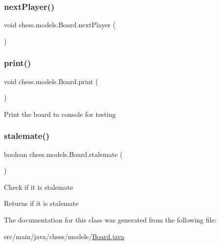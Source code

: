 \subsubsection{\texorpdfstring{next\+Player()}{nextPlayer()}}
{\footnotesize\ttfamily void chess.\+models.\+Board.\+next\+Player (\begin{DoxyParamCaption}{ }\end{DoxyParamCaption})}

\mbox{\label{classchess_1_1models_1_1_board_af22da20d051a6cc31c6730e5dc80d81e}} 
\subsubsection{\texorpdfstring{print()}{print()}}
{\footnotesize\ttfamily void chess.\+models.\+Board.\+print (\begin{DoxyParamCaption}{ }\end{DoxyParamCaption})}

Print the board to console for testing \mbox{\label{classchess_1_1models_1_1_board_aca772c3b56248d6e3fbf97d00a9abaf9}} 
\subsubsection{\texorpdfstring{stalemate()}{stalemate()}}
{\footnotesize\ttfamily boolean chess.\+models.\+Board.\+stalemate (\begin{DoxyParamCaption}{ }\end{DoxyParamCaption})}

Check if it is stalemate

\begin{DoxyReturn}{Returns}
if it is stalemate 
\end{DoxyReturn}


The documentation for this class was generated from the following file\+:\begin{DoxyCompactItemize}
\item 
src/main/java/chess/models/\mbox{\hyperlink{_board_8java}{Board.\+java}}\end{DoxyCompactItemize}
